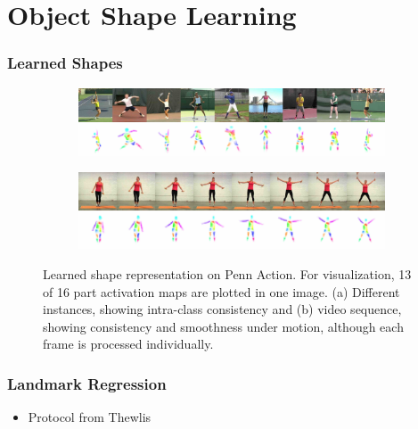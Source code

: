\section{Object Shape Learning}
		\begin{frame}
		\frametitle{Learned Shapes}
			\begin{figure}[htp]
				\begin{subfigure}{1.\textwidth}
				\centering
				\includegraphics[trim={0cm 0cm 0cm 0cm},clip, width=1.\linewidth]{fig/shape/shape8white}\caption{}
				\label{fig:shape_penn}
				\end{subfigure}
				\begin{subfigure}{1.\textwidth}
				\centering
				\includegraphics[trim={0cm 0cm 0cm 0cm},clip, width=1.\linewidth]{fig//shape/shape_yoga8}\caption{}
				\label{fig:shape_tennis}
				\end{subfigure}
				\caption{Learned shape representation on Penn Action. For visualization, 13 of 16 part activation maps are plotted in one image. (a) Different instances, showing intra-class consistency and (b) video sequence, showing consistency and smoothness under motion, although each frame is processed individually.}
				\label{fig:shape}
			\end{figure}
		\end{frame}

		\begin{frame}
		\frametitle{Landmark Regression}
			\begin{itemize}
				\item Protocol from Thewlis
			\end{itemize}
		\end{frame}

